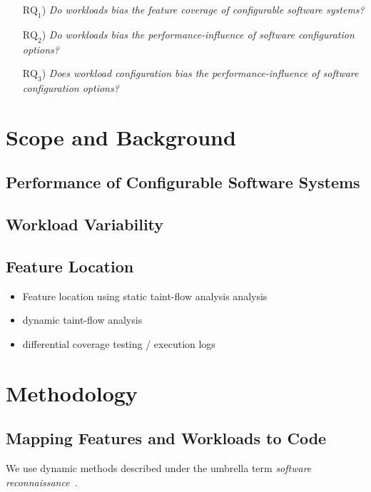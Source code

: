 \documentclass[conference]{IEEEtran}
\begin{document}
\begin{enumerate}
	\item[\textbf{$\text{RQ}_1$})] \textit{Do workloads bias the feature coverage of configurable software systems?}
	\item[\textbf{$\text{RQ}_2$})] \textit{Do workloads bias the performance-influence of software configuration options?}
	\item[\textbf{$\text{RQ}_3$})] \textit{Does workload configuration  bias the performance-influence of software configuration options?}
\end{enumerate}


\section{Scope and Background}

\subsection{Performance of Configurable Software Systems}
\subsection{Workload Variability}
\subsection{Feature Location}
\begin{itemize}
	\item Feature location using static taint-flow analysis analysis\cite{velez_2020_configcrusher_jase,lillack_2018_lotrack_tse,luo_2019_cova}
	\item dynamic taint-flow analysis \cite{bell_phosphor_2014,velez_comprex_2021}
	\item differential coverage testing / execution logs~\cite{wong_integrated_2005,wilde_early_1996,agrawal_fault_1995,simmons_industrial_2006,chen_dynamic_nodate,sherwood_reducing_nodate}
\end{itemize}

\section{Methodology}
\subsection{Mapping Features and Workloads to Code}
We use dynamic methods described under the umbrella term \emph{software reconnaissance}~\cite{wilde_reconnaissance_1995}.
\end{document}
